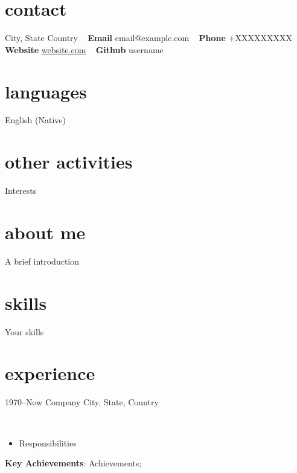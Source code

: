 \documentclass[]{cv-style}          %
\begin{document}


\begin{aside}
%
%
\section{contact}
City, State
Country
~
\textbf{Email}
email@example.com
~
\textbf{Phone}
+XXXXXXXXX
~
\textbf{Website}
\url{website.com}
~
\textbf{Github}
username
%
\section{languages}
English (Native)
%
\section{other activities}
Interests
%
\end{aside}


\section{about me}
A brief introduction

\section{skills}
  \vspace{-0.2cm}
Your skills


\section{experience}

\begin{entrylist}
\entry
  {1970--Now}
  {Company}
  {City, State, Country}
  {\\
  \begin{itemize}
    \item Responsibilities
  \end{itemize}
  \vspace{\parsep}
  \textbf{Key Achievements}:  Achievements;}
\end{entrylist}
\end{document}
